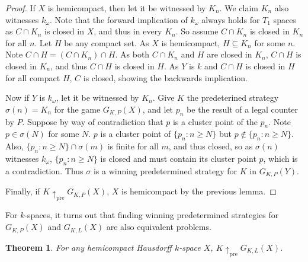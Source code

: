 \documentclass[11pt]{article}
\theoremstyle{plain}
\newtheorem{theorem}{Theorem}
\theoremstyle{definition}
\theoremstyle{remark}
\newcommand{\prewin}{\uparrow_{\text{pre}}}
\begin{document}
\begin{proof}
If $X$ is hemicompact, then let it be witnessed by $K_n$. We claim $K_n$ also witnesses $k_\omega$. Note that the forward implication of $k_\omega$ always holds for $T_1$ spaces as $C\cap K_n$ is closed in $X$, and thus in every $K_n$. So assume $C\cap K_n$ is closed in $K_n$ for all $n$. Let $H$ be any compact set. As $X$ is hemicompact, $H\subseteq K_n$ for some $n$. Note $C\cap H = (C\cap K_n)\cap H$. As both $C \cap K_n$ and $H$ are closed in $K_n$, $C\cap H$ is closed in $K_n$, and thus $C\cap H$ is closed in $H$. As $Y$ is $k$ and $C\cap H$ is closed in $H$ for all compact $H$, $C$ is closed, showing the backwards implication.

Now if $Y$ is $k_\omega$, let it be witnessed by $K_n$. Give $K$ the predeterined strategy $\sigma(n)=K_n$ for the game $G_{K,P}(X)$, and let $p_n$ be the result of a legal counter by $P$. Suppose by way of contradiction that $p$ is a cluster point of the $p_n$. Note $p\in \sigma(N)$ for some $N$. $p$ is a cluster point of $\{p_n : n\geq N\}$ but $p\not\in \{p_n : n \geq N\}$. Also, $\{p_n : n \geq N\} \cap \sigma(m)$ is finite for all $m$, and thus closed, so as $\sigma(n)$ witnesses $k_\omega$, $\{p_n : n\geq N\}$ is closed and must contain its cluster point $p$, which is a contradiction. Thus $\sigma$ is a winning predetermined strategy for $K$ in $G_{K,P}(Y)$.

Finally, if $K \prewin G_{K,P}(X)$, $X$ is hemicompact by the previous lemma.
\end{proof}

For $k$-spaces, it turns out that finding winning predetermined strategies for $G_{K,P}(X)$ and $G_{K,L}(X)$ are also equivalent problems.

\begin{theorem}
For any hemicompact Hausdorff $k$-space $X$, $K \prewin G_{K,L}(X)$.
\end{theorem}
\end{document}
